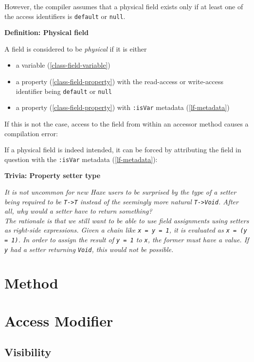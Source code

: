 \documentclass[a4paper,oneside]{book}
\newcommand{\type}[1]{\texttt{#1}}
\newcommand{\expr}[1]{\texttt{#1}}
\newenvironment{myshaded}
  {\def\FrameCommand{\fboxsep=\topsep\colorbox{bgcolor}}%
  \MakeFramed {\advance\hsize-\width \FrameRestore}}%
 {\endMakeFramed}
\newcommand{\define}[3][Definition]
	{\begin{myshaded}\noindent\textbf{#1: #2}\par\nobreak\noindent\ignorespaces#3\label{def:#2}\end{myshaded}}
\newcommand{\trivia}[2]
	{\begin{myshaded}\noindent\textbf{Trivia: #1}\par\nobreak\noindent\ignorespaces\textit{#2}\end{myshaded}}
\newcommand{\tref}[2]{#1 (\ref{#2})}
\newcommand{\haxe}[2][]{%
}
\begin{document}
However, the compiler assumes that a physical field exists only if at least one of the access identifiers is \expr{default} or \expr{null}.

\define{Physical field}{A field is considered to be \emph{physical} if it is either
	\begin{itemize}
		\item a \tref{variable}{class-field-variable}
		\item a \tref{property}{class-field-property} with the read-access or write-access identifier being \expr{default} or \expr{null}
		\item a \tref{property}{class-field-property} with \expr{:isVar} \tref{metadata}{lf-metadata}
	\end{itemize}
}

If this is not the case, access to the field from within an accessor method causes a compilation error:

\haxe{assets/GetterSetter2.hx}

If a physical field is indeed intended, it can be forced by attributing the field in question with the \expr{:isVar} \tref{metadata}{lf-metadata}:

\haxe{assets/GetterSetter3.hx}


\trivia{Property setter type}{It is not uncommon for new Haxe users to be surprised by the type of a setter being required to be \type{T->T} instead of the seemingly more natural \type{T->Void}. After all, why would a \emph{setter} have to return something?\\
The rationale is that we still want to be able to use field assignments using setters as right-side expressions. Given a chain like \expr{x = y = 1}, it is evaluated as \expr{x = (y = 1)}. In order to assign the result of \expr{y = 1} to \expr{x}, the former must have a value. If \expr{y} had a setter returning \type{Void}, this would not be possible.}


\section{Method}
\label{class-field-method}


\section{Access Modifier}
\label{class-field-access-modifier}

\subsection{Visibility}
\label{class-field-visibility}
\end{document}
